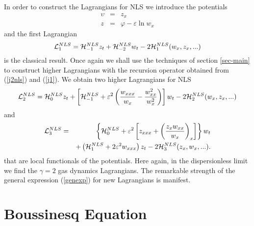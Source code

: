\documentclass[a4paper,12pt]{article}
\begin{document}
In order to construct the Lagrangians for NLS we introduce the
potentials
\begin{eqnarray}
\upsilon & = & z_{x} \nonumber \\ z & = & \varphi -\varepsilon \ln
w_{x}   \label{potup}
\end{eqnarray}
and the first Lagrangian
\begin{equation}
{\cal L}^{NLS}_{1}= {\cal H}^{NLS}_{-1} z_{t}+ {\cal H}^{NLS}_{-2}
w_{t}  - 2 {\cal H}_{1}^{NLS}(w_{x},z_{x},...)
\end{equation}
is the classical result. Once again we shall use the techniques of
section \ref{sec-main} to construct higher Lagrangians with the
recursion operator obtained from (\ref{j2nls}) and (\ref{j1}). We
obtain two higher Lagrangians for NLS
\begin{equation}
{\cal L}^{NLS}_{2}= {\cal H}^{NLS}_{0} z_{t}+ \left[ {\cal
H}^{NLS}_{-1} +\varepsilon ^{2} \left(\frac{w_{xxx}}{w_{x}}
-\frac{w_{xx}^{2}}{w_{x}^{2}} \right)\right] w_{t} -2 {\cal
H}_{2}^{NLS}(w_{x},z_{x},...)
\end{equation}
and
\begin{eqnarray}
{\cal L}^{NLS}_{3}&=& \left\{{\cal H}^{NLS}_{0}+\varepsilon^{2}
\left[ z_{xxx} + \left(\frac{z_{x}w_{xx}}{w_{x}} \right)_{x}
\right] \right\} w_{t} \\
&&+  \left( {\cal H}^{NLS}_{1} + 2 \varepsilon ^{2} w_{xxx}
\right) z_{t} -2 {\cal H}_{3}^{NLS}(z_{x},w_{x},...).  \nonumber
\end{eqnarray}
that are local functionals of the potentials. Here again, in the
dispersionless limit we find the $\gamma=2$ gas dynamics
Lagrangians. The remarkable strength of the general expression
(\ref{genexp}) for new Lagrangians is manifest.

\section{Boussinesq Equation}
\end{document}

